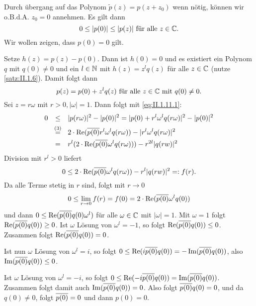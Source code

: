\begin{beweis}
	Durch übergang auf das Polynom $\tilde{p}(z) = p(z+z_0)$ wenn nötig, können wir o.B.d.A. $z_0 = 0$ annehmen.
	Es gilt dann
	\begin{equation}
		0 \leq |p(0)| \leq |p(z)| \text{ für alle } z \in \mathbb{C}. \label{eq:II.1.11.1}
	\end{equation}
	Wir wollen zeigen, dass $p(0) = 0$ gilt.
	
	Setze $h(z) = p(z) - p(0)$.
	Dann ist $h(0) = 0$ und es existiert ein Polynom $q$ mit $q(0) \neq 0$ und ein $l \in \mathbb{N}$ mit $h(z) = z^{l} q(z)$ für alle $z \in \mathbb{C}$ (nutze \autoref{satz:II.1.6}).
	Damit folgt dann
	\[
		p(z) = p(0) + z^{l}q(z) \text{ für alle } z \in \mathbb{C} \text{ mit } q(0) \neq 0.
	\]
	Sei $z = r \omega$ mit $r > 0, |\omega| = 1$.
	Dann folgt mit \eqref{eq:II.1.11.1}:
	\begin{align*}
		0 &\stack{}{\leq} |p(r \omega)|^2 - |p(0)|^2 = |p(0) + r^{l}\omega^{l}q(r\omega)|^2 - |p(0)|^2 \\
		&\stack{(3)}{=} 2 \cdot \Re(\ol{p(0)} r^{l} \omega^{l} q(r\omega)) - |r^l \omega^{l} q(r\omega)|^2 \\
		&\stack{}{=} r^{l} (2\cdot \Re(\ol{p(0)} \omega^{l}q(r\omega))) - r^{2l} |q(rw)|^2
	\end{align*}
	Division mit $r^{l} > 0$ liefert
	\[
		0 \leq 2 \cdot \operatorname{Re}(\overline{p(0)}\omega^{l} q(r\omega)) - r^{l} |q(rw)|^2 =: f(r).
	\]
	Da alle Terme stetig in $r$ sind, folgt mit $r \rightarrow 0$
	\[
		0 \leq \lim\limits_{r \rightarrow 0} f(r) = f(0) = 2 \cdot \operatorname{Re}(\overline{p(0)} \omega^l q(0))
	\]
	und dann $0 \leq \operatorname{Re}(\overline{p(0)}q(0) \omega^l)$ für alle $\omega \in \mathbb{C}$ mit $|\omega| = 1$.
	Mit $\omega = 1$ folgt $\operatorname{Re}(\overline{p(0)}q(0)) \geq 0$.
	Ist $\omega$ Lösung von $\omega^l = -1$, so folgt $\operatorname{Re}(\overline{p(0)}q(0)) \leq 0$.
	Zusammen folgt $\operatorname{Re}(\overline{p(0)}q(0))=0$.
	
	Ist nun $\omega$ Lösung von $\omega^l=i$, so folgt $0 \leq \operatorname{Re}(i \overline{p(0)} q(0)) = -\operatorname{Im}(\overline{p(0)}q(0))$, also $\operatorname{Im}(\overline{p(0)}q(0)) \leq 0$.
	
	Ist $\omega$ Lösung von $\omega^l = -i$, so folgt $0 \leq \operatorname{Re}(-i \overline{p(0)} q(0)) = \operatorname{Im}(\overline{p(0)}q(0))$.
	Zusammen folgt damit auch $\operatorname{Im}(\overline{p(0)}q(0)) = 0$.
	Also folgt $\overline{p(0)}q(0)=0$, und da $q(0) \neq 0$, folgt $\overline{p(0)} = 0$ und dann $p(0) = 0$. \qedhere
\end{beweis}

\cleardoubleoddemptypage